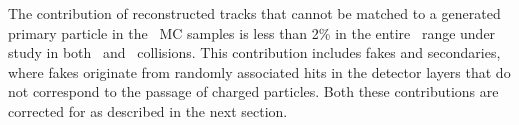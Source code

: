 The contribution of reconstructed tracks that cannot be matched to a generated primary particle in the \pp\ MC samples is less than 2\% in the entire \pttrk\ range under study in both \pp\ and \pbpb\ collisions.
This contribution includes fakes and secondaries, where fakes originate from randomly associated hits in the detector layers that do not correspond to the passage of charged particles.
Both these contributions are corrected for as described in the next section.









